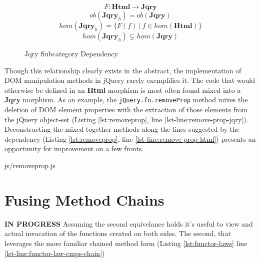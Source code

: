 \documentclass[preprint]{sigplanconf}
\begin{document}
\begin{figure}
\vspace{-10pt}
\begin{equation}
F : \mathbf{Html} \to \mathbf{Jqry}
\end{equation}
\vspace{-10pt}
\begin{equation}
ob(\mathbf{Jqry}_{h}) = ob(\mathbf{Jqry})
\end{equation}
\vspace{-10pt}
\begin{equation}
hom(\mathbf{Jqry}_{h}) = \{ F(f)\ |\ f \in hom(\mathbf{Html}) \}
\end{equation}
\vspace{-10pt}
\begin{equation}
hom(\mathbf{Jqry}_{h}) \subsetneq hom(\mathbf{Jqry})
\end{equation}
\vspace{-10pt}
\caption{Jqry Subcategory Dependency}
\vspace{-10pt}
\label{fig:dependent-sub-cat}
\end{figure}

Though this relationship clearly exists in the abstract, the implementation of DOM manipulation methods in jQuery rarely exemplifies it. The code that would otherwise be defined in an \textbf{Html} morphism is most often found mixed into a \textbf{Jqry} morphism. As an example, the \verb|jQuery.fn.removeProp| method mixes the deletion of DOM element properties with the extraction of those elements from the jQuery object-set (Listing \ref{lst:removeprop}, line \ref{lst-line:remove-prop-jqry}). Deconstructing the mixed together methods along the lines suggested by the dependency (Listing \ref{lst:removeprop}, line \ref{lst-line:remove-prop-html}) presents an opportunity for improvement on a few fronts.

\begin{lstinputlisting}[
    language=JavaScript,
    caption={Satisfying the Functor Laws},
    label={lst:removeprop},
    escapeinside={@}{@}
]{js/removeprop.js}
\end{lstinputlisting}

\section{Fusing Method Chains}\label{sec:fusing-method-chains}

\textbf{IN PROGRESS}
Assuming the second equivelance holds it's useful to view and actual invocation of the functions created on both sides. The second, that leverages the more familiar chained method form (Listing \ref{lst:functor-laws} line \ref{lst-line:functor-law-cmps-chain})
\end{document}
